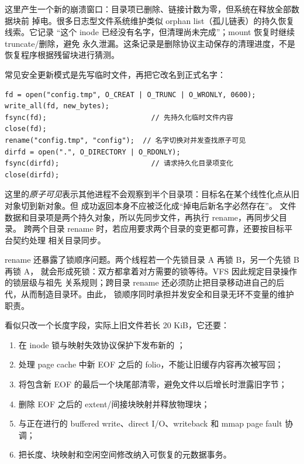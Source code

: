 这里产生一个新的崩溃窗口：目录项已删除、链接计数为零，但系统在释放全部数据块前
掉电。很多日志型文件系统维护类似 orphan list（孤儿链表）的持久恢复线索。它记录
“这个 inode 已经没有名字，但清理尚未完成”；mount 恢复时继续 truncate/删除，避免
永久泄漏。这条记录是删除协议主动保存的清理进度，不是恢复程序根据残留块进行猜测。


常见安全更新模式是先写临时文件，再把它改名到正式名字：

\begin{lstlisting}
fd = open("config.tmp", O_CREAT | O_TRUNC | O_WRONLY, 0600);
write_all(fd, new_bytes);
fsync(fd);                         // 先持久化临时文件内容
close(fd);
rename("config.tmp", "config");  // 名字切换对并发查找原子可见
dirfd = open(".", O_DIRECTORY | O_RDONLY);
fsync(dirfd);                      // 请求持久化目录项变化
close(dirfd);
\end{lstlisting}

这里的\emph{原子可见}表示其他进程不会观察到半个目录项：目标名在某个线性化点从旧
对象切到新对象。但  成功返回本身不应被泛化成“掉电后新名字必然存在”。
文件数据和目录项是两个持久对象，所以先同步文件，再执行 rename，再同步父目录。
跨两个目录 rename 时，若应用要求两个目录的变更都可靠，还要按目标平台契约处理
相关目录同步。

rename 还暴露了锁顺序问题。两个线程若一个先锁目录 A 再锁 B，另一个先锁 B 再锁 A，
就会形成死锁：双方都拿着对方需要的锁等待。VFS 因此规定目录操作的锁层级与祖先
关系规则；跨目录 rename 还必须防止把目录移动进自己的后代，从而制造目录环。由此，
锁顺序同时承担并发安全和目录无环不变量的维护职责。


 看似只改一个长度字段，实际上旧文件若长 20 KiB，它还要：

\begin{enumerate}\tightlist
\item 在 inode 锁与映射失效协议保护下发布新的 ；
\item 处理 page cache 中新 EOF 之后的 folio，不能让旧缓存内容再次被写回；
\item 将包含新 EOF 的最后一个块尾部清零，避免文件以后增长时泄露旧字节；
\item 删除 EOF 之后的 extent/间接块映射并释放物理块；
\item 与正在进行的 buffered write、direct I/O、writeback 和 mmap page fault 协调；
\item 把长度、块映射和空闲空间修改纳入可恢复的元数据事务。
\end{enumerate}

